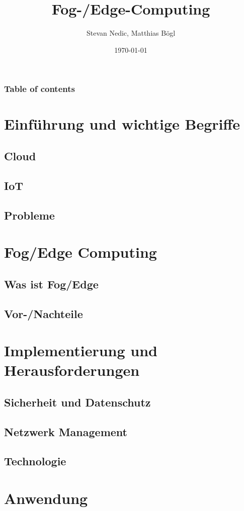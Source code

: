 \documentclass{beamer}
\title[Fog-/Edge-Computing]{Fog-/Edge-Computing}
\author{Stevan Nedic, Matthias Bögl}
\institute[CS] 
{
Paris Lodron Universität Salzburg \\ 
\medskip
}
\date{\today }
\begin{document}
\begin{frame}
	\titlepage 
\end{frame}

\begin{frame}
	\frametitle{Table of contents} 
	\tableofcontents 
\end{frame}


\section{Einführung und wichtige Begriffe} 
    \subsection{Cloud}
    \subsection{IoT}
    \subsection{Probleme}
\section{Fog/Edge Computing}
    \subsection{Was ist Fog/Edge}
    \subsection{Vor-/Nachteile}
\section{Implementierung und Herausforderungen}
    \subsection{Sicherheit und Datenschutz}
    \subsection{Netzwerk Management}
    \subsection{Technologie}
\section{Anwendung}
\end{document}
